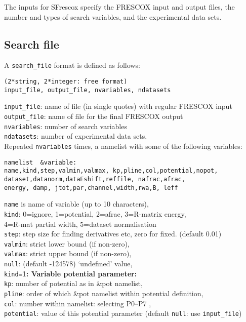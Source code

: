 \documentclass[11pt]{article}
\begin{document}
The inputs for {\sc SFrescox} specify the FRESCOX input and output files,
the number and types of search variables, and the experimental data sets.

\subsection{Search file}
A {\tt search\_file} format is defined as follows:
\begin{verbatim}
(2*string, 2*integer: free format)
input_file, output_file, nvariables, ndatasets
\end{verbatim}
\smallskip

{\tt input\_file}: name of file (in single quotes) with regular FRESCOX input\\
{\tt output\_file}: name of file for the final FRESCOX output\\
{\tt nvariables}: number of search variables\\
{\tt ndatasets}:  number of experimental data sets.\\

Repeated {\tt nvariables} times, a namelist with some of the following variables:
\begin{verbatim}
namelist  &variable:
name,kind,step,valmin,valmax, kp,pline,col,potential,nopot,
dataset,datanorm,dataEshift,reffile, nafrac,afrac,
energy, damp, jtot,par,channel,width,rwa,B, leff
\end{verbatim}
{\tt name} is name of variable (up to 10 characters),\\
{\tt kind}: 0=ignore, 1=potential, 2=afrac, 3=R-matrix energy,\\
   \hspace*{10mm} 4=R-mat partial width, 5=dataset normalisation\\
{\tt step}: step size for finding derivatives etc, zero for fixed. (default 0.01)\\
{\tt valmin}: strict lower bound (if non-zero),\\
{\tt valmax}: strict upper bound (if non-zero), \\
{\tt null}: (default -124578) `undefined' value,\\

{\tt kind=}{\bf 1: Variable potential parameter:}\\
{\tt kp}: number of potential as in \&pot namelist,\\
{\tt pline}: order of which \&pot namelist within potential definition,\\
{\tt col}:   number within namelist: selecting P0--P7 ,\\
{\tt potential}: value of this potential parameter (default {\tt null}: use {\tt input\_file})\\
\end{document}
